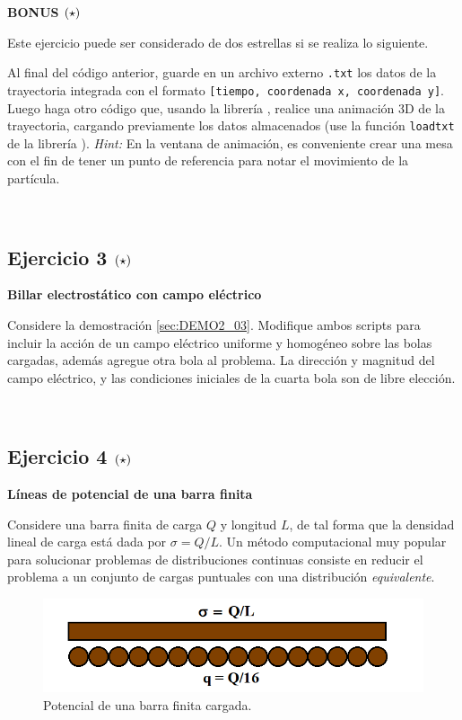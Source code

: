 \textbf{BONUS \large{$\left( \star \right)$}}

Este ejercicio puede ser considerado de dos estrellas si se realiza lo 
siguiente. 

Al final del código anterior, guarde en un archivo externo 
\texttt{.txt} los datos de la trayectoria integrada con el formato 
\texttt{[tiempo, coordenada x, coordenada y]}. Luego haga otro código
que, usando la librería \mayavi, realice una animación 3D de la 
trayectoria, cargando previamente los datos almacenados (use la función
\texttt{loadtxt} de la librería \numpy). \textit{Hint:} En la ventana de 
animación, es conveniente crear una mesa con el fin de tener un 
punto de referencia para notar el movimiento de la partícula.

\

\subsection*{Ejercicio 3 \large{$\left( \star \right)$}}

\textbf{Billar electrostático con campo eléctrico}


Considere la demostración \ref{sec:DEMO2_03}. Modifique ambos scripts para
incluir la acción de un campo eléctrico uniforme y homogéneo sobre las bolas
cargadas, además agregue otra bola al problema. La dirección y magnitud del 
campo eléctrico, y las condiciones iniciales de la cuarta bola son de libre
elección.

\

\subsection*{Ejercicio 4 \large{$\left( \star \right)$}}

\textbf{Líneas de potencial de una barra finita}


Considere una barra finita de carga $Q$ y longitud $L$, de tal forma que
la densidad lineal de carga está dada por $\sigma = Q/L$. Un método 
computacional muy popular para solucionar problemas de distribuciones 
continuas consiste en reducir el problema a un conjunto de cargas puntuales
con una distribución \textit{equivalente}.

\begin{figure}[htbp]
	\centering
	\includegraphics[width=0.75
	\textwidth]
	{./pictures/bar.png}

	\caption{\small{Potencial de una barra finita cargada.}}
	
	\label{fig:bar_Q}
\end{figure}


